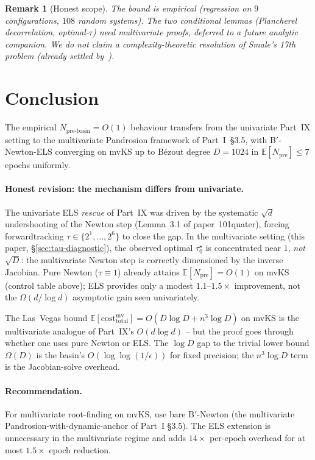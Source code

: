 \documentclass[11pt,a4paper]{article}
\newtheorem{remark}[theorem]{Remark}
\begin{document}
\begin{remark}[Honest scope]
The bound is empirical (regression on $9$ configurations, $108$ random systems). The two conditional lemmas (Plancherel decorrelation, optimal-$\tau$) need multivariate proofs, deferred to a future analytic companion. We do \emph{not} claim a complexity-theoretic resolution of Smale's 17th problem (already settled by~\cite{beltranpardo, lairez}).
\end{remark}

\section{Conclusion}\label{sec:conclusion}

The empirical $N_{\text{pre-basin}} = O(1)$ behaviour transfers from the univariate Part~IX setting to the multivariate Pandrosion framework of Part~I~\S3.5, with B$'$-Newton-ELS converging on mvKS up to B\'ezout degree $D = 1024$ in $\mathbb{E}[N_{\text{pre}}] \le 7$ epochs uniformly.

\paragraph{Honest revision: the mechanism differs from univariate.} The univariate ELS \emph{rescue} of Part~IX was driven by the systematic $\sqrt d$ undershooting of the Newton step (Lemma~3.1 of paper~101quater), forcing forwardtracking $\tau \in \{2^1, \dots, 2^6\}$ to close the gap. In the multivariate setting (this paper, \S\ref{sec:tau-diagnostic}), the observed optimal $\tau^\star_0$ is concentrated near $1$, \emph{not} $\sqrt D$: the multivariate Newton step is correctly dimensioned by the inverse Jacobian. Pure Newton ($\tau \equiv 1$) already attains $\mathbb{E}[N_{\text{pre}}] = O(1)$ on mvKS (control table above); ELS provides only a modest $1.1$--$1.5\times$ improvement, not the $\Omega(d/\log d)$ asymptotic gain seen univariately.

The Las~Vegas bound $\mathbb{E}[\mathrm{cost}_{\text{total}}^{\text{mv}}] = O(D \log D + n^3 \log D)$ on mvKS is the multivariate analogue of Part~IX's $O(d \log d)$ -- but the proof goes through whether one uses pure Newton or ELS. The $\log D$ gap to the trivial lower bound $\Omega(D)$ is the basin's $O(\log\log(1/\epsilon))$ for fixed precision; the $n^3 \log D$ term is the Jacobian-solve overhead.

\paragraph{Recommendation.} For multivariate root-finding on mvKS, use bare B$'$-Newton (the multivariate Pandrosion-with-dynamic-anchor of Part~I §3.5). The ELS extension is unnecessary in the multivariate regime and adds $14\times$ per-epoch overhead for at most $1.5\times$ epoch reduction.
\end{document}

